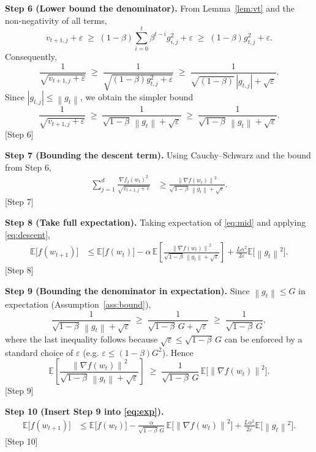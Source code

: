 \documentclass{article}
\newcommand{\E}{\mathbb{E}}
\newcommand{\norm}[1]{\left\|#1\right\|}
\begin{document}
\noindent\textbf{Step 6 (Lower bound the denominator).}  
From Lemma~\ref{lem:vt} and the non‑negativity of all terms,
\[
v_{t+1,j}+\varepsilon\;\ge\;(1-\beta)\sum_{i=0}^{t}\beta^{t-i}g_{i,j}^{2}+\varepsilon
\;\ge\;(1-\beta)g_{t,j}^{2}+\varepsilon.
\]
Consequently,
\[
\frac{1}{\sqrt{v_{t+1,j}+\varepsilon}}
\;\ge\;\frac{1}{\sqrt{(1-\beta)g_{t,j}^{2}+\varepsilon}}
\;\ge\;\frac{1}{\sqrt{(1-\beta)}\,|g_{t,j}|+\sqrt{\varepsilon}}.
\]
Since $|g_{t,j}| \le \norm{g_{t}}$, we obtain the simpler bound
\[
\frac{1}{\sqrt{v_{t+1,j}+\varepsilon}}
\;\ge\;\frac{1}{\sqrt{1-\beta}\,\norm{g_{t}}+\sqrt{\varepsilon}}
\;\ge\;\frac{1}{\sqrt{1-\beta}\,\norm{g_{t}}+ \sqrt{\varepsilon}}.
\]
[Step 6]

\noindent\textbf{Step 7 (Bounding the descent term).}  
Using Cauchy–Schwarz and the bound from Step 6,
\begin{align}
\sum_{j=1}^{d}\frac{\nabla f_{j}(w_{t})^{2}}{\sqrt{v_{t+1,j}+\varepsilon}}
&\ge
\frac{\norm{\nabla f(w_{t})}^{2}}{\sqrt{1-\beta}\,\norm{g_{t}}+\sqrt{\varepsilon}}.\label{eq:descent}
\end{align}
[Step 7]

\noindent\textbf{Step 8 (Take full expectation).}  
Taking expectation of \eqref{eq:mid} and applying \eqref{eq:descent},
\begin{align}
\E\!\big[f(w_{t+1})\big]
&\le \E\!\big[f(w_{t})\big]
   -\alpha\,\E\!\left[\frac{\norm{\nabla f(w_{t})}^{2}}{\sqrt{1-\beta}\,\norm{g_{t}}+\sqrt{\varepsilon}}\right]
   +\frac{L\alpha^{2}}{2\varepsilon}\E\!\big[\norm{g_{t}}^{2}\big].\label{eq:exp}
\end{align}
[Step 8]

\noindent\textbf{Step 9 (Bounding the denominator in expectation).}  
Since $\norm{g_{t}}\le G$ in expectation (Assumption~\ref{ass:bound}),
\[
\frac{1}{\sqrt{1-\beta}\,\norm{g_{t}}+\sqrt{\varepsilon}}
\;\ge\;
\frac{1}{\sqrt{1-\beta}\,G+\sqrt{\varepsilon}}
\;\ge\;
\frac{1}{\sqrt{1-\beta}\,G},
\]
where the last inequality follows because $\sqrt{\varepsilon}\le \sqrt{1-\beta}\,G$ can be enforced by a standard choice of $\varepsilon$ (e.g. $\varepsilon\le (1-\beta)G^{2}$).  
Hence
\[
\E\!\left[\frac{\norm{\nabla f(w_{t})}^{2}}{\sqrt{1-\beta}\,\norm{g_{t}}+\sqrt{\varepsilon}}\right]
\;\ge\;
\frac{1}{\sqrt{1-\beta}\,G}\,\E\!\big[\norm{\nabla f(w_{t})}^{2}\big].\label{eq:denom}
\]
[Step 9]

\noindent\textbf{Step 10 (Insert Step 9 into \eqref{eq:exp}).}
\begin{align}
\E\!\big[f(w_{t+1})\big]
&\le \E\!\big[f(w_{t})\big]
   -\frac{\alpha}{\sqrt{1-\beta}\,G}\,\E\!\big[\norm{\nabla f(w_{t})}^{2}\big]
   +\frac{L\alpha^{2}}{2\varepsilon}\E\!\big[\norm{g_{t}}^{2}\big].\label{eq:tel}
\end{align}
[Step 10]
\end{document}
